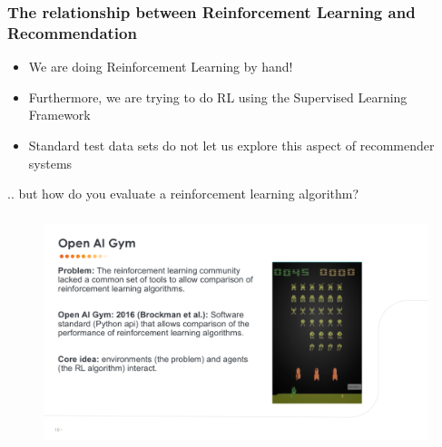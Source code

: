 \begin{frame}
  \frametitle{The relationship between Reinforcement Learning and Recommendation}

\begin{itemize}
\item We are doing Reinforcement Learning by hand!
\pause
\item Furthermore, we are trying to do RL using the Supervised Learning Framework
\pause
\item Standard test data sets do not let us explore this aspect of recommender systems
\end{itemize}

\pause
.. but how do you evaluate a reinforcement learning algorithm?
\end{frame}

  



\begin{frame}
  \frametitle{}
 
 
   \begin{figure}[h!]
     \includegraphics[scale=0.39]{images/openai.png}
       \centering
       \label{motex1}
   \end{figure}
     
 \end{frame}




